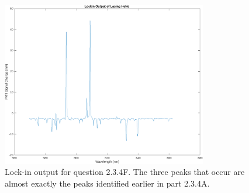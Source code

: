 \documentclass[letterpaper, reqno,11pt]{article}
\begin{document}
\begin{figure}[tb]
    \centering
    \includegraphics[width=0.8\textwidth]{4F}
    \caption{Lock-in output for question 2.3.4F. The three peaks that occur are almost exactly the peaks identified earlier in part 2.3.4A.}
    \label{fig:4F}
\end{figure}
\end{document}
